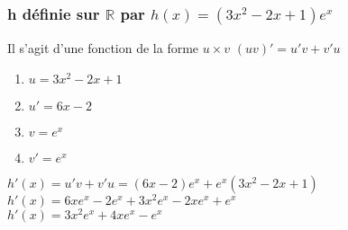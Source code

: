 \documentclass[t]{beamer}
\begin{document}
\begin{frame}
\frametitle{h définie sur $\mathbb{R} $ par $h(x) = (3x^2-2x+1)e^x$}
\pause
Il s'agit d'une fonction de la forme $ u \times v $ 
\pause
\( (uv)' = u'v + v'u \)
\pause
\begin{enumerate}
\item<+-> \(u =  3x^2-2x+1 \)
\item<+-> \(u'= 6x - 2 \)
\item<+-> \(v = e^x \)
\item<+-> \(v' = e^x \)
\end{enumerate}
\( h'(x) = u'v + v'u = (6x - 2)e^x + e^x(3x^2-2x+1)\) \\
\pause
\( h'(x) = 6xe^x -2e^x + 3x^2e^x -2xe^x+e^x \) \\
\pause
\( h'(x) = 3x^2e^x + 4xe^x -e^x\)
\end{frame}
\end{document}

